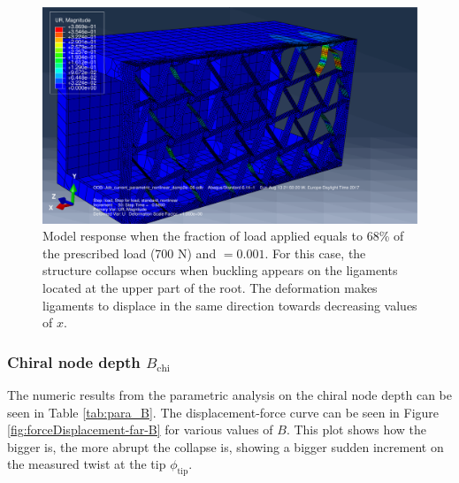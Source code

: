       \begin{figure}[!htpb] %
        \centering
        \includegraphics[width=0.8 \textwidth]{../figures/result-sim/eccen/0coma001_UR}
        \caption[Model response when the fraction of load applied equals to 68\% of the prescribed load (700 N) and \chie$= 0.001$]{Model response when the fraction of load applied equals to 68\% of the prescribed load (700 N) and \chie$= 0.001$. For this case, the structure collapse occurs when buckling appears on the ligaments located at the upper part of the root. The deformation makes ligaments to displace in the same direction towards decreasing values of $x$.}
        \label{fig:0coma001_UR}
      \end{figure}


    \clearpage
    \subsubsection{Chiral node depth $B_{\mathrm{chi}}$}

      The numeric results from the parametric analysis on the chiral node depth \chiB can be seen in Table \ref{tab:para_B}. The displacement-force curve can be seen in Figure \ref{fig:forceDisplacement-far-B} for various values of $B$. This plot shows how the bigger \chiB is, the more abrupt the collapse is, showing a bigger sudden increment on the measured twist at the tip $\phi_{\mathrm{tip}}$.

